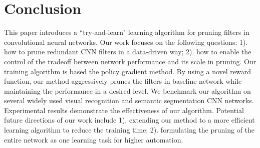 \documentclass[10pt,twocolumn,letterpaper]{article}
\begin{document}
\section{Conclusion}

This paper introduces a ``try-and-learn" learning algorithm for pruning filters in convolutional neural networks. Our work focuses on the following questions: 1). how to prune redundant CNN filters in a data-driven way; 2). how to enable the control of the tradeoff between network performance and its scale in pruning. Our training algorithm is based the policy gradient method. By using a novel reward function, our method aggressively prunes the filters in baseline network while maintaining the performance in a desired level. We benchmark our algorithm on several widely used visual recognition and semantic segmentation CNN networks. Experimental results demonstrate the effectiveness of our algorithm. Potential future directions of our work include 1). extending our method to a more efficient learning algorithm to reduce the training time; 2). formulating the pruning of the entire network as one learning task for higher automation.









{\small


}
\end{document}
